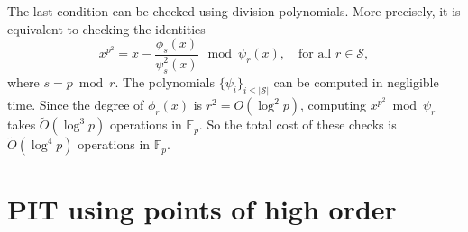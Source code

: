 \documentclass[11pt]{article}
\theoremstyle{plain}
\theoremstyle{definition}
\newcommand{\abs}[1]{\left\vert#1\right\vert}
\newcommand{\tildO}{\tilde{O}}
\def\F{\ensuremath{\mathbb{F}}}
\begin{document}
The last condition can be checked using division polynomials. More precisely, it is equivalent to 
checking the identities
\begin{equation}
\label{equ:schoof}
	x^{p^2} = x - \frac{\phi_s(x)}{\psi_s^2(x)} ~ \bmod \psi_r(x), \quad \text{for all } r \in 
	\mathcal{S},
\end{equation}
where $s = p \bmod r$. The polynomials $\{ \psi_i \}_{i \le \abs{\mathcal{S}}}$ can be computed in 
negligible time. Since the degree of $\phi_r(x)$ is $r^2 = O(\log^2 p)$, computing $x^{p^2} \bmod 
\psi_r$ takes $\tildO(\log^3 p)$ operations in $\F_p$. So the total cost of these checks is 
$\tildO(\log^4 p)$ operations in $\F_p$.




\section{PIT using points of high order}
\label{sec:pit-h-order}
\end{document}
